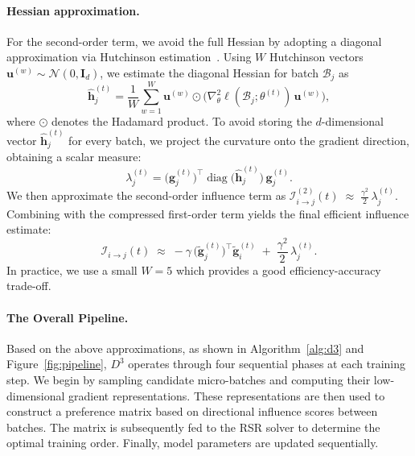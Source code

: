 \paragraph{Hessian approximation.}
For the second-order term, we avoid the full Hessian by adopting a diagonal approximation via Hutchinson estimation~\cite{DBLP:conf/iclr/Liu0HL024}. Using $W$ Hutchinson vectors $\mathbf{u}^{(w)} \sim \mathcal{N}(0, \mathbf{I}_d)$, we estimate the diagonal Hessian for batch $\mathcal{B}_j$ as
{
\setlength{\abovedisplayskip}{8pt}
\setlength{\belowdisplayskip}{8pt}
\[
\hat{\mathbf{h}}^{(t)}_j = \frac{1}{W} \sum_{w=1}^{W} \mathbf{u}^{(w)} \odot \bigl( \nabla^2_\theta \ell(\mathcal{B}_j; \theta^{(t)}) \, \mathbf{u}^{(w)} \bigr),
\]
}
where $\odot$ denotes the Hadamard product. To avoid storing the $d$-dimensional vector $\hat{\mathbf{h}}^{(t)}_j$ for every batch, we project the curvature onto the gradient direction, obtaining a scalar measure:
\[
\lambda_j^{(t)} = \bigl(\mathbf{g}^{(t)}_j\bigr)^\top \operatorname{diag}\bigl(\hat{\mathbf{h}}^{(t)}_j\bigr) \, \mathbf{g}^{(t)}_j.
\]
We then approximate the second-order influence term as $\mathcal{I}^{(2)}_{i \to j}(t) \;\approx\; \frac{\gamma^2}{2} \, \lambda_j^{(t)}$. Combining with the compressed first-order term yields the final efficient influence estimate:
{
\setlength{\abovedisplayskip}{8pt}
\setlength{\belowdisplayskip}{8pt}
\[
\mathcal{I}_{i \to j}(t) \;\approx\; - \gamma \, \bigl(\tilde{\mathbf{g}}^{(t)}_j\bigr)^\top \tilde{\mathbf{g}}^{(t)}_i \;+\; \frac{\gamma^2}{2} \, \lambda_j^{(t)}.
\]
}
In practice, we use a small $W = 5$ which provides a good efficiency-accuracy trade-off.

\paragraph{The Overall Pipeline.} Based on the above approximations, as shown in Algorithm~\ref{alg:d3} and Figure~\ref{fig:pipeline}, $D^3$ operates through four sequential phases at each training step. We begin by sampling candidate micro-batches and computing their low-dimensional gradient representations. These representations are then used to construct a preference matrix based on directional influence scores between batches. The matrix is subsequently fed to the RSR solver to determine the optimal training order. Finally, model parameters are updated sequentially.

